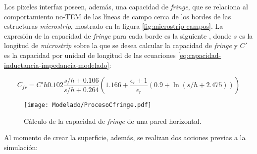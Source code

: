 Los pixeles interfaz poseen, además, una capacidad de \textit{fringe}, que se relaciona al comportamiento no-TEM de las líneas de campo cerca de los bordes de las estructuras \textit{microstrip}, mostrado en la figura \ref{fig:microstrip-campos}. La expresión de la capacidad de \textit{fringe} para cada borde es la siguiente \cite{Hammerstad:discont}, donde $s$ es la longitud de \textit{microstrip} sobre la que se desea calcular la capacidad de \textit{fringe} y $C'$ es la capacidad por unidad de longitud de las ecuaciones \ref{eq:capacidad-inductancia-impedancia-modelado}:

\begin{equation}
	C_{fr} = C' h 0.102 \frac{s/h+0.106}{s/h+0.264} \left(1.166 + \frac{\epsilon_r+1}{\epsilon_r} (0.9+\ln(s/h+2.475)) \right)
\end{equation}

\begin{figure}[h]
	\centering
	\texttt{[image: Modelado/ProcesoCfringe.pdf]}
	\caption{Cálculo de la capacidad de \textit{fringe} de una pared horizontal.}
	\label{fig:profundidad-para-cfringe}
\end{figure}

Al momento de crear la superficie, además, se realizan dos acciones previas a la simulación:

